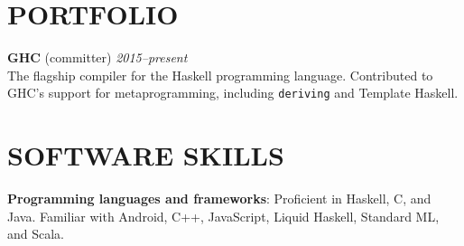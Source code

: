 \documentclass{res}
\begin{document}
\begin{resume}
\section{PORTFOLIO}
    \textbf{GHC} (committer) \hfill \textit{2015--present} \\
    The flagship compiler for the Haskell programming language. Contributed to GHC's support for metaprogramming, including \texttt{deriving} and Template Haskell. \\

\section{SOFTWARE SKILLS}
    \textbf{Programming languages and frameworks}: Proficient in Haskell, C, and Java. Familiar with Android, C++, JavaScript, Liquid Haskell, Standard ML, and Scala.
\end{resume}
\end{document}
